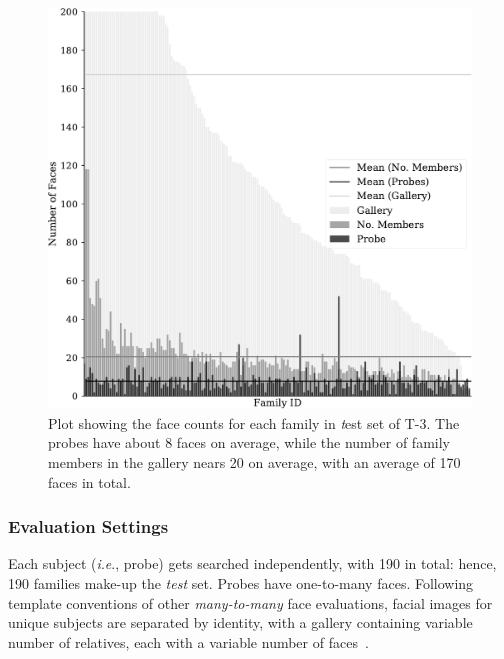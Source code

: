 \documentclass[letterpaper, 10 pt, conference]{ieeeconf}  %
\newcommand{\ie}{\textit{i}.\textit{e}., }
\begin{document}
\begin{figure}[t!]
    \centering
    \includegraphics[width = .8\linewidth]{figures/barplot-crop.pdf}
    \caption{Plot showing the face counts for each family in {\emph test} set of T-3. The probes have about 8 faces on average, while the number of family members in the gallery nears 20 on average, with an average of 170 faces in total.}
    \label{fig:track3:counts}
\end{figure}
%
\subsubsection{Evaluation Settings} 
Each subject (\ie probe) gets searched independently, with 190 in total: hence, 190 families make-up the \textit{test} set. Probes have one-to-many faces. Following template conventions of other \textit{many-to-many} face evaluations, facial images for unique subjects are separated by identity, with a gallery containing variable number of relatives, each with a variable number of faces~\cite{whitelam2017iarpa}.
\end{document}

